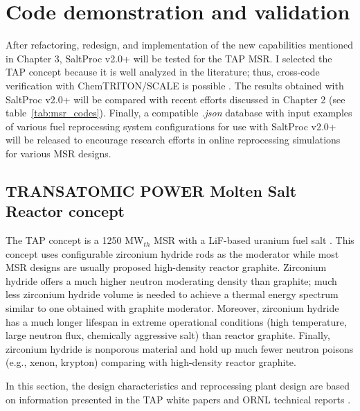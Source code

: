 \chapter[Code demonstration and validation]{Code demonstration and validation}

After refactoring, redesign, and implementation of the new capabilities 
mentioned in Chapter 3, SaltProc v2.0+ will be tested for the \gls{TAP} 
\gls{MSR}. I selected the \gls{TAP} concept because it is well analyzed in the 
literature; thus, cross-code verification with ChemTRITON/SCALE is possible 
\cite{betzler_assessment_2017}. The results obtained with SaltProc v2.0+ will 
be compared with recent efforts discussed in Chapter 2 (see  
table~\ref{tab:msr_codes}). Finally, a compatible \textit{.json} database with 
input examples of various fuel reprocessing system configurations for use with 
SaltProc v2.0+ will be released to encourage research efforts in online 
reprocessing simulations for various \gls{MSR} designs.

\section{TRANSATOMIC POWER Molten Salt Reactor concept}
The \gls{TAP} concept is a 1250 MW$_{th}$ \gls{MSR} with a LiF-based uranium 
fuel salt \cite{transatomic_power_corporation_technical_2016}. This concept 
uses configurable zirconium hydride rods as the moderator while most \gls{MSR} 
designs are usually proposed high-density reactor graphite. Zirconium hydride 
offers a much higher neutron moderating density than graphite; much less 
zirconium hydride volume is needed to achieve a thermal energy spectrum 
similar to one obtained with graphite moderator. Moreover, zirconium hydride 
has a much longer lifespan in extreme operational conditions (high 
temperature, large neutron flux, chemically aggressive salt) than reactor 
graphite. Finally, zirconium hydride is nonporous material and hold up much 
fewer neutron poisons (e.g., xenon, krypton) comparing with high-density 
reactor graphite.

In this section, the design characteristics and reprocessing plant design are 
based on
information presented in the TAP white papers  
\cite{transatomic_power_corporation_technical_2016, 
transatomic_power_corporation_neutronics_2016} and \gls{ORNL} technical 
reports \cite{betzler_two-dimensional_2016, betzler_assessment_2017}.

